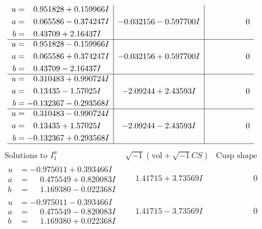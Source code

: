 \documentclass[1p]{elsarticle_modified}
\theoremstyle{definition}
\newcommand{\I}{\sqrt{-1}}
\begin{document}
$$\begin{array}{c|c|c}
\begin{aligned}
u &= \phantom{-}0.951828 + 0.159966 I \\
a &= \phantom{-}0.065586 - 0.374247 I \\
b &= \phantom{-}0.43709 + 2.16437 I\end{aligned}
 & -0.032156 - 0.597700 I & \phantom{-0.000000 } 0 \\ \hline\begin{aligned}
u &= \phantom{-}0.951828 - 0.159966 I \\
a &= \phantom{-}0.065586 + 0.374247 I \\
b &= \phantom{-}0.43709 - 2.16437 I\end{aligned}
 & -0.032156 + 0.597700 I & \phantom{-0.000000 } 0 \\ \hline\begin{aligned}
u &= \phantom{-}0.310483 + 0.990724 I \\
a &= \phantom{-}0.13435 - 1.57025 I \\
b &= -0.132367 - 0.293568 I\end{aligned}
 & -2.09244 + 2.43593 I & \phantom{-0.000000 } 0 \\ \hline\begin{aligned}
u &= \phantom{-}0.310483 - 0.990724 I \\
a &= \phantom{-}0.13435 + 1.57025 I \\
b &= -0.132367 + 0.293568 I\end{aligned}
 & -2.09244 - 2.43593 I & \phantom{-0.000000 } 0\\
 \hline 
 \end{array}$$\newpage$$\begin{array}{c|c|c}  
\text{Solutions to }I^u_{1}& \I (\text{vol} + \sqrt{-1}CS) & \text{Cusp shape}\\
 \hline 
\begin{aligned}
u &= -0.975011 + 0.393466 I \\
a &= \phantom{-}0.475549 + 0.820083 I \\
b &= \phantom{-}1.169380 - 0.022368 I\end{aligned}
 & \phantom{-}1.41715 + 3.73569 I & \phantom{-0.000000 } 0 \\ \hline\begin{aligned}
u &= -0.975011 - 0.393466 I \\
a &= \phantom{-}0.475549 - 0.820083 I \\
b &= \phantom{-}1.169380 + 0.022368 I\end{aligned}
 & \phantom{-}1.41715 - 3.73569 I & \phantom{-0.000000 } 0 \\ \hline\begin{aligned}

\end{aligned}
\end{array}$$
\end{document}
